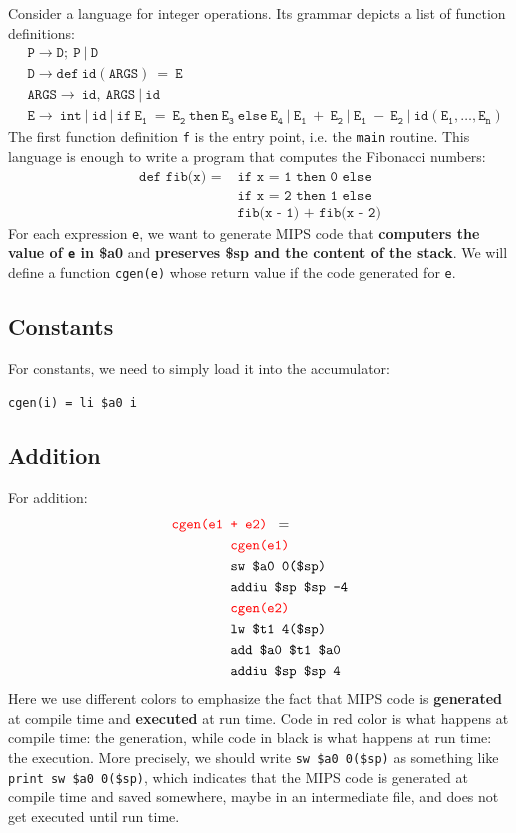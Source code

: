 Consider a language for integer operations. Its grammar depicts a list of function definitions:
\begin{align*}
&\mathtt{P\rightarrow D;\:P\:|\:D}\\
&\mathtt{D\rightarrow def\:id(ARGS)\:=\:E}\\
&\mathtt{ARGS\rightarrow\:id,\:ARGS\:|\:id}\\
&\mathtt{E\rightarrow\:int\:|\:id\:|\:if\:E_1\:=\:E_2\:then\:E_3\:else\:E_4\:|\:E_1\:+\:E_2\:|\:E_1\:-\:E_2\:|\:id(E_1,\dots,E_n)}
\end{align*}
The first function definition \texttt{f} is the entry point, i.e. the \texttt{main} routine. This language is enough to write a program that computes the Fibonacci numbers:
\begin{equation}\label{fibonacci}\begin{split}
\texttt{def fib(x) = }&\texttt{if x = 1 then 0 else}\\
&\texttt{if x = 2 then 1 else}\\
&\texttt{fib(x - 1) + fib(x - 2)}
\end{split}\end{equation}
For each expression \texttt{e}, we want to generate MIPS code that \textbf{computers the value of \texttt{e} in \$a0} and \textbf{preserves \$sp and the content of the stack}. We will define a function \texttt{cgen(e)} whose return value if the code generated for \texttt{e}.

\subsection{Constants}
For constants, we need to simply load it into the accumulator:
\begin{center}
\texttt{\color{red}cgen(i)}\texttt{ = li \$a0 i}
\end{center}
\subsection{Addition}
For addition:
\begin{align*}
\texttt{\color{red}cgen(e1 }&\texttt{\color{red}+ e2) }=\\
&\texttt{\color{red}cgen(e1)}\\
&\texttt{sw \$a0 0(\$sp)}\\
&\texttt{addiu \$sp \$sp -4}\\
&\texttt{\color{red} cgen(e2)}\\
&\texttt{lw \$t1 4(\$sp)}\\
&\texttt{add \$a0 \$t1 \$a0}\\
&\texttt{addiu \$sp \$sp 4}
\end{align*}
Here we use different colors to emphasize the fact that MIPS code is \textbf{generated} at compile time and \textbf{executed} at run time. Code in red color is what happens at compile time: the generation, while code in black is what happens at run time: the execution. More precisely, we should write \texttt{sw \$a0 0(\$sp)} as something like \texttt{{\color{red}print} sw \$a0 0(\$sp)}, which indicates that the MIPS code is generated at compile time and saved somewhere, maybe in an intermediate file, and does not get executed until run time.

